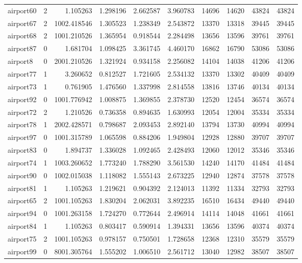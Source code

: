 \begin{longtable}{|l|r|r|r|r|r|r|r|r|r|}
airport60 & 2 & 1.105263 & 1.298196 & 2.662587 & 3.960783 & 14696 & 14620 & 43824 & 43824 \\
airport67 & 2 & 1002.418546 & 1.305523 & 1.238349 & 2.543872 & 13370 & 13318 & 39445 & 39445 \\
airport68 & 2 & 1001.210526 & 1.365954 & 0.918544 & 2.284498 & 13656 & 13596 & 39761 & 39761 \\
airport87 & 0 & 1.681704 & 1.098425 & 3.361745 & 4.460170 & 16862 & 16790 & 53086 & 53086 \\
airport8 & 0 & 2001.210526 & 1.321924 & 0.934158 & 2.256082 & 14104 & 14038 & 41206 & 41206 \\
airport77 & 1 & 3.260652 & 0.812527 & 1.721605 & 2.534132 & 13370 & 13302 & 40409 & 40409 \\
airport73 & 1 & 0.761905 & 1.476560 & 1.337998 & 2.814558 & 13816 & 13746 & 40134 & 40134 \\
airport92 & 0 & 1001.776942 & 1.008875 & 1.369855 & 2.378730 & 12520 & 12454 & 36574 & 36574 \\
airport72 & 2 & 1.210526 & 0.736358 & 0.894635 & 1.630993 & 12054 & 12004 & 35334 & 35334 \\
airport78 & 1 & 2002.428571 & 0.798687 & 2.093453 & 2.892140 & 13794 & 13730 & 40994 & 40994 \\
airport97 & 0 & 1001.315789 & 1.065598 & 0.884206 & 1.949804 & 12928 & 12880 & 39707 & 39707 \\
airport83 & 0 & 1.894737 & 1.336028 & 1.092465 & 2.428493 & 12060 & 12012 & 35346 & 35346 \\
airport74 & 1 & 1003.260652 & 1.773240 & 1.788290 & 3.561530 & 14240 & 14170 & 41484 & 41484 \\
airport90 & 0 & 1002.015038 & 1.118082 & 1.555143 & 2.673225 & 12940 & 12874 & 37578 & 37578 \\
airport81 & 1 & 1.105263 & 1.219621 & 0.904392 & 2.124013 & 11392 & 11334 & 32793 & 32793 \\
airport65 & 2 & 1001.105263 & 1.830204 & 2.062031 & 3.892235 & 16510 & 16434 & 49440 & 49440 \\
airport94 & 0 & 1001.263158 & 1.724270 & 0.772644 & 2.496914 & 14114 & 14048 & 41661 & 41661 \\
airport84 & 1 & 1.105263 & 0.803417 & 0.590914 & 1.394331 & 13656 & 13596 & 40374 & 40374 \\
airport75 & 2 & 1001.105263 & 0.978157 & 0.750501 & 1.728658 & 12368 & 12310 & 35579 & 35579 \\
airport99 & 0 & 8001.305764 & 1.555202 & 1.006510 & 2.561712 & 13040 & 12982 & 38507 & 38507 \\

\end{longtable}
